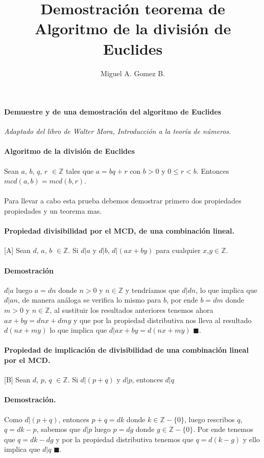 \documentclass{article}
\title{Demostración teorema de Algoritmo de la división de Euclides}
\author{Miguel A. Gomez B.}
\begin{document}
	\maketitle
	
	\paragraph{Demuestre y de una demostración del algoritmo de Euclides}
	\textit{Adaptado del libro de Walter Mora, Introducción a la teoría de números.}
	\paragraph{Algoritmo de la división de Euclides}
	Sean $a$, $b$, $q$, $r$ $\in \mathbb{Z}$ tales que $a = bq + r$ con $b>0$ y $0\leq r<b$. Entonces $mcd(a,b) = mcd(b,r)$.
	\paragraph{}
	Para llevar a cabo esta prueba debemos demostrar primero dos propiedades propiedades y un teorema mas.
	
	\paragraph{Propiedad divisibilidad por el MCD, de una combinación lineal.}[A] \label{1} Sean $d$, $a$, $b$ $\in \mathbb{Z}$. Si $d|a$ y $d|b$, $d|(ax + by)$ para cualquier $x$,$y \in \mathbb{Z}$.
	
	\paragraph{Demostración} $d|a$ luego  $a = dn$ donde $n > 0$ y $n \in \mathbb{Z}$ y tendríamos que $d|dn$, lo que implica que $d|an$, de manera análoga se verifica lo mismo para $b$, por ende $b = dm$ donde $m > 0$ y $n \in \mathbb{Z}$, al sustituir los resultados anteriores tenemos ahora $ax + by = dnx + dmy$ y que por la propiedad distributiva nos lleva al resultado $d(nx + my)$ lo que implica que $d|ax + by = d(nx + my)$ $\blacksquare$.
	
	\paragraph{Propiedad de implicación de divisibilidad de una combinación lineal por el MCD.}[B] Sean $d$, $p$, $q$ $\in \mathbb{Z}$. Si $d|(p+q)$ y $d|p$, entonces $d|q$
	
	\paragraph{Demostración.} Como $d|(p + q)$, entonces $p + q = dk$ donde $k \in \mathbb{Z}-\{0\}$, luego rescribos $q$, $q = dk - p$, sabemos que $d|p$ luego $p = dg$ donde $g \in \mathbb{Z}-\{0\}$. Por ende tenemos que $q = dk - dg$ y por la propiedad distributiva tenemos que $q = d(k - g)$ y ello implica que $d|q$ $\blacksquare$.
	
\end{document}
